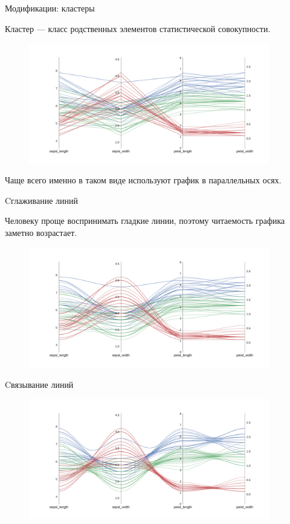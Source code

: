 \documentclass[fleqn, xcolor=x11names]{beamer}
\begin{document}
\begin{frame}{Модификации: кластеры}

    \vspace{10px}

    Кластер — класс родственных элементов статистической совокупности.

    \begin{figure}[htb]
        \centering
        \includegraphics[width=10.5cm]{color_pc.pdf}
    \end{figure}

    Чаще всего именно в таком виде используют график в параллельных осях.
\end{frame}

\begin{frame}{Cглаживание линий}

    \vspace{10px}

    Человеку проще воспринимать гладкие линии, поэтому читаемость графика заметно возрастает.

    \begin{figure}[htb]
        \centering
        \includegraphics[width=10.5cm]{smooth_pc.pdf}
    \end{figure}
\end{frame}

\begin{frame}{Cвязывание линий}
    \begin{figure}[htb]
        \centering
        \includegraphics[width=10.5cm]{bundle_0.3_pc.pdf}
    \end{figure}
\end{frame}
\end{document}
